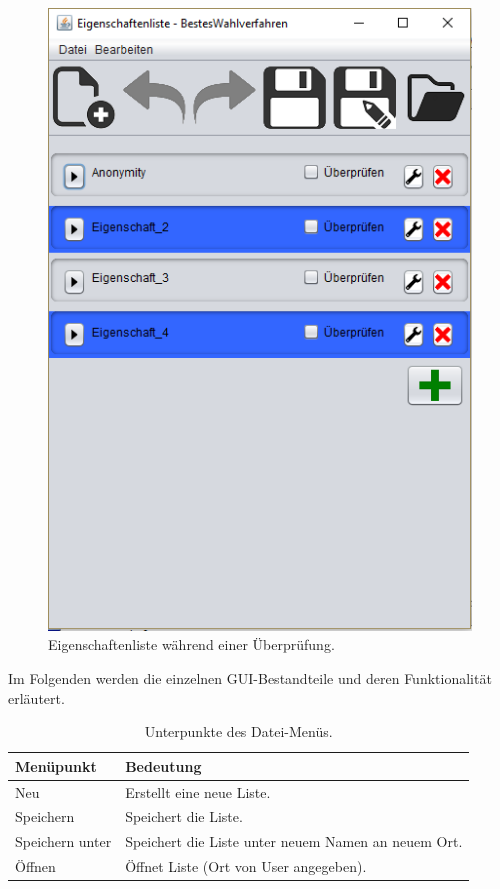 \documentclass[a4paper]{scrreprt}
\begin{document}
\begin{figure}[H]
\begin{minipage}{.5\textwidth}
  \includegraphics[scale=0.5]{Eigenschaften-Liste-waehrend-testen.png}
  \caption{Eigenschaftenliste während einer Überprüfung.}
  \label{fig:sub2}
\end{minipage}
\end{figure}

Im Folgenden werden die einzelnen \ac{GUI}-Bestandteile und deren Funktionalität erläutert.

\begin{table}[H]
\begin{tabular}{|p{3cm}|p{12cm}|}
Menüpunkt & Bedeutung \\
\hline
Neu & Erstellt eine neue Liste.\\
\hline
Speichern & Speichert die Liste.\\
\hline
Speichern unter & Speichert die Liste unter neuem Namen an neuem Ort.\\
\hline
Öffnen & Öffnet Liste (Ort von User angegeben).
\end{tabular}
\label{Eigenschaftenliste-Datei-Menüpunkte}
\caption{Unterpunkte des Datei-Menüs.}
\end{table}
\end{document}
